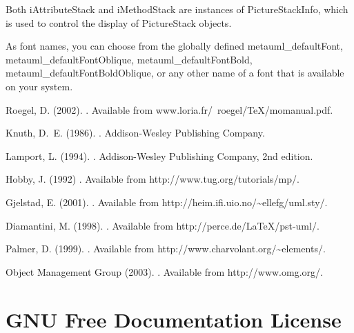 \documentclass{article}
\newcommand{\code}{\ttfamily}
\begin{document}
\begin{verbatim}
\end{verbatim}

Both {\code iAttributeStack} and {\code iMethodStack} are instances of
{\code PictureStackInfo}, which is used to control the display of {\code PictureStack} objects.

As font names, you can choose from the globally defined {\code metauml\_defaultFont}, {\code metauml\_defaultFontOblique}, {\code metauml\_defaultFontBold}, {\code metauml\_defaultFontBoldOblique}, or any other name of a font that is available on your system.




\begin{thebibliography}{1}
Roegel, D. (2002).
.
\newblock Available from {\code www.loria.fr/~roegel/TeX/momanual.pdf}.

Knuth, D.~E. (1986).
.
\newblock Addison-Wesley Publishing Company.

Lamport, L. (1994).
.
\newblock Addison-Wesley Publishing Company, 2nd edition.


Hobby, J. (1992)
.
\newblock Available from {\code http://www.tug.org/tutorials/mp/}.

Gjelstad, E. (2001).
.
\newblock Available from {\code http://heim.ifi.uio.no/\~{ }ellefg/uml.sty/}.

Diamantini, M. (1998).
.
\newblock Available from {\code http://perce.de/LaTeX/pst-uml/}.

Palmer, D. (1999).
.
\newblock Available from {\code http://www.charvolant.org/\~{ }elements/}.

Object Management Group (2003).
.
\newblock Available from {\code http://www.omg.org/}.
\end{thebibliography}

\pagebreak
\pagebreak
\pagebreak


\pagebreak
\section{GNU Free Documentation License}

\end{document}
